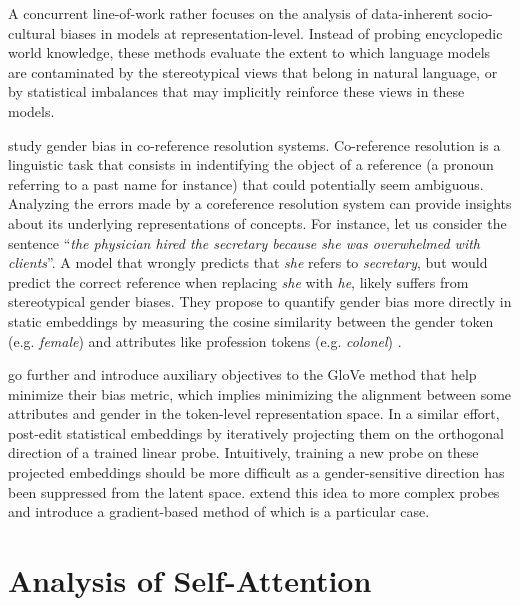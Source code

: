 A concurrent line-of-work rather focuses on the analysis of data-inherent socio-cultural biases in models at representation-level. Instead of probing encyclopedic world knowledge, these methods evaluate the extent to which language models are contaminated by the stereotypical views that belong in natural language, or by statistical imbalances that may implicitly reinforce these views in these models.

\citet{zhao-etal-2018-gender} study gender bias in co-reference resolution systems. Co-reference resolution is a linguistic task that consists in indentifying the object of a reference (a pronoun referring to a past name for instance) that could potentially seem ambiguous. Analyzing the errors made by a coreference resolution system can provide insights about its underlying representations of concepts. For instance, let us consider the sentence ``\textit{the physician hired the secretary because she was overwhelmed with clients}''. A model that wrongly predicts that \textit{she} refers to \textit{secretary}, but would predict the correct reference when replacing \textit{she} with \textit{he}, likely suffers from stereotypical gender biases. They propose to quantify gender bias more directly in static embeddings by measuring the cosine similarity between the gender token (e.g. \textit{female}) and attributes like profession tokens (e.g. \textit{colonel}) \citep{zhao-etal-2018-learning}.

\citet{zhao-etal-2018-learning} go further and introduce auxiliary objectives to the GloVe method that help minimize their bias metric, which implies minimizing the alignment between some attributes and gender in the token-level representation space. In a similar effort, \citet{ravfogel-etal-2020-null} post-edit statistical embeddings by iteratively projecting them on the orthogonal direction of a trained linear probe. Intuitively, training a new probe on these projected embeddings should be more difficult as a gender-sensitive direction has been suppressed from the latent space. \citet{iskander-etal-2023-shielded} extend this idea to more complex probes and introduce a gradient-based method of which \citet{ravfogel-etal-2020-null} is a particular case.





\section{Analysis of Self-Attention}

